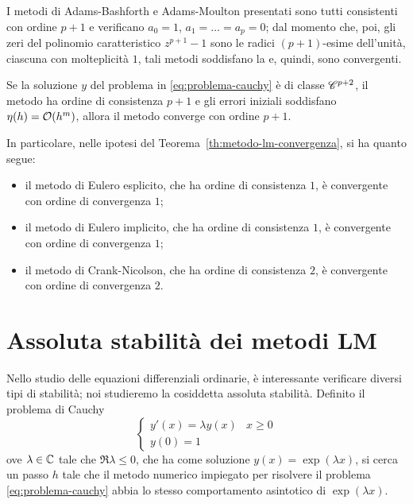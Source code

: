 	\begin{osservazione}
		I metodi di Adams-Bashforth e Adams-Moulton presentati sono tutti consistenti con ordine \(p + 1\) e verificano \(a_0 = 1\), \(a_1 = \dots = a_p = 0\); dal momento che, poi, gli zeri del polinomio caratteristico \(z^{p + 1} - 1\) sono le radici \((p + 1)\)-esime dell'unità, ciascuna con molteplicità \(1\), tali metodi soddisfano la  e, quindi, sono convergenti.
		
		Se la soluzione \(y\) del problema in \eqref{eq:problema-cauchy} è di classe \(\mathscr{C}^{p + 2}\), il metodo ha ordine di consistenza \(p + 1\) e gli errori iniziali soddisfano \(\eta (h) = \order{h^m}\), allora il metodo converge con ordine \(p + 1\).
		
		In particolare, nelle ipotesi del Teorema~\ref{th:metodo-lm-convergenza}, si ha quanto segue:
		\begin{itemize}
			\item il metodo di Eulero esplicito, che ha ordine di consistenza \(1\), è convergente con ordine di convergenza \(1\);
			\item il metodo di Eulero implicito, che ha ordine di consistenza \(1\), è convergente con ordine di convergenza \(1\);
			\item il metodo di Crank-Nicolson, che ha ordine di consistenza \(2\), è convergente con ordine di convergenza \(2\).
		\end{itemize}
	\end{osservazione}

\section[Assoluta stabilità dei metodi \textsc{lm}]{Assoluta stabilità dei metodi LM}
	
	\noindent Nello studio delle equazioni differenziali ordinarie, è interessante verificare diversi tipi di stabilità; noi studieremo la cosiddetta assoluta stabilità. Definito il problema di Cauchy
	\begin{equation}\label{eq:problema-cauchy-exp}
		\begin{cases}
			y' (x) = \lambda y(x) & x \ge 0 \\
			y (0) = 1
		\end{cases}
	\end{equation}
	ove \(\lambda \in \mathbb{C}\) tale che \(\Re \lambda \le 0\), che ha come soluzione \(y (x) = \exp(\lambda x)\), si cerca un passo \(h\) tale che il metodo numerico impiegato per risolvere il problema \eqref{eq:problema-cauchy} abbia lo stesso comportamento asintotico di \(\exp (\lambda x)\).
	
